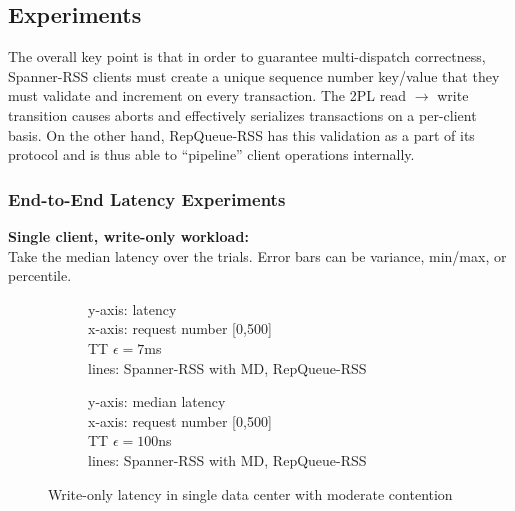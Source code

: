 \documentclass[letterpaper, 11pt]{article}
\begin{document}
\subsection{Experiments}
The overall key point is that in order to guarantee multi-dispatch correctness, Spanner-RSS clients must create a unique sequence number key/value that they must validate and increment on every transaction. The 2PL read $\rightarrow$ write transition causes aborts and effectively serializes transactions on a per-client basis. On the other hand, RepQueue-RSS has this validation as a part of its protocol and is thus able to ``pipeline'' client operations internally.
\subsubsection{End-to-End Latency Experiments}
\textbf{Single client, write-only workload:}\\
Take the median latency over the trials. Error bars can be variance, min/max, or percentile.
\begin{figure}[H]
  \centering
  \begin{subfigure}[t]{0.45\textwidth}
    \centering
    \begin{tcolorbox}[width=\textwidth, sharp corners=all, frame empty]
      y-axis: latency
      \\
      x-axis: request number [0,500] \\
      TT $\epsilon = 7$ms \\
      lines: Spanner-RSS with MD, RepQueue-RSS     
    \end{tcolorbox}
  \end{subfigure}
  \begin{subfigure}[t]{0.45\textwidth}
    \centering
  \begin{tcolorbox}[width=\textwidth, sharp corners=all, frame empty]
    y-axis: median latency
    \\
    x-axis: request number [0,500] \\
    TT $\epsilon = 100$ns \\
    lines: Spanner-RSS with MD, RepQueue-RSS     
  \end{tcolorbox}
\end{subfigure}
  \caption{Write-only latency in single data center with moderate contention}
\end{figure}
\end{document}
